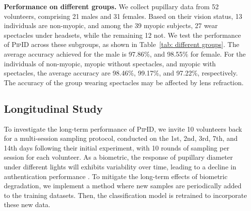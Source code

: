 \documentclass[sigconf]{acmart}
\newcommand{\sysname}{\textsc{PipID}\xspace}
\begin{document}
\noindent   \textbf{Performance on different groups.}
We collect pupillary data from 52 volunteers, comprising 21 males and 31 females. Based on their vision status, 13 individuals are non-myopic, and among the 39 myopic subjects, 27 wear spectacles under headsets, while the remaining 12 not. We test the performance of \sysname across these subgroups, as shown in Table~\ref{tab: different groups}. The average accuracy achieved for the male is 97.86\%, and 98.55\% for female. For the individuals of non-myopic, myopic without spectacles, and myopic with spectacles, the average accuracy are 98.46\%, 99.17\%, and 97.22\%, respectively. The accuracy of the group wearing spectacles may be affected by lens refraction.

\begin{table}[t]
\centering
\caption{Performance of \sysname on different groups.}
\vspace{-2mm}
\label{tab: different groups}
\vspace{-2mm}
\end{table}







\subsection{Longitudinal Study}
To investigate the long-term performance of \sysname, we invite 10 volunteers back for a multi-session sampling protocol, conducted on the 1st, 2nd, 3rd, 7th, and 14th days following their initial experiment, with 10 rounds of sampling per session for each volunteer. As a biometric, the response of pupillary diameter under different lights will exhibits variability over time, leading to a decline in authentication performance \cite{KASTHURIRANGAN20061393,LobatoRincon2014}. To mitigate the long-term effects of biometric degradation, we implement a method where new samples are periodically added to the training datasets. Then, the classification model is retrained to incorporate these new data.
\end{document}
